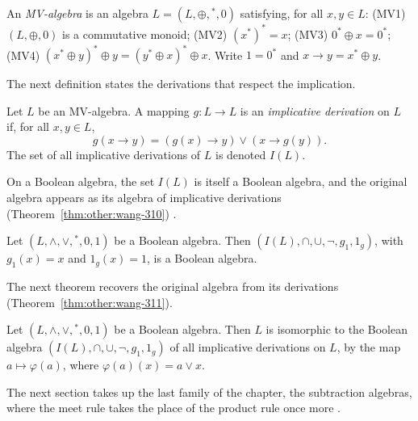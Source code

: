 \begin{definition}\label{def:other:mv-algebra}
An \emph{MV-algebra} is an algebra $L = (L, \oplus, {}^{*}, 0)$
satisfying, for all $x, y \in L$:
\textup{(MV1)} $(L, \oplus, 0)$ is a commutative monoid;
\textup{(MV2)} $(x^{*})^{*} = x$;
\textup{(MV3)} $0^{*} \oplus x = 0^{*}$;
\textup{(MV4)} $(x^{*} \oplus y)^{*} \oplus y = (y^{*} \oplus x)^{*} \oplus x$.
Write $1 = 0^{*}$ and $x \to y = x^{*} \oplus y$.
\end{definition}

The next definition states the derivations that respect the implication.

\begin{definition}\label{def:other:mv-implicative}
Let $L$ be an MV-algebra. A mapping $g \colon L \to L$ is an
\emph{implicative derivation} on $L$ if, for all $x, y \in L$,
\[
g(x \to y) = (g(x) \to y) \vee (x \to g(y)).
\]
The set of all implicative derivations of $L$ is denoted $I(L)$.
\end{definition}

On a Boolean algebra, the set $I(L)$ is itself a Boolean algebra, and the
original algebra appears as its algebra of implicative derivations (Theorem~\ref{thm:other:wang-310})
\cite[Theorem~3.10, p.~267]{WangSheQian2019}.\begin{theorem}\label{thm:other:wang-310}
Let $(L, \wedge, \vee, {}^{*}, 0, 1)$ be a Boolean algebra. Then
$(I(L), \cap, \cup, \neg, g_{1}, 1_{g})$, with $g_{1}(x) = x$ and
$1_{g}(x) = 1$, is a Boolean algebra.
\end{theorem}

The next theorem recovers the original algebra from its derivations
(Theorem~\ref{thm:other:wang-311}).

\begin{theorem}\label{thm:other:wang-311}
Let $(L, \wedge, \vee, {}^{*}, 0, 1)$ be a Boolean algebra. Then $L$ is
isomorphic to the Boolean algebra $(I(L), \cap, \cup, \neg, g_{1}, 1_{g})$
of all implicative derivations on $L$, by the map $a \mapsto \varphi(a)$,
where $\varphi(a)(x) = a \vee x$.
\end{theorem}

The next section takes up the last family of the chapter, the subtraction
algebras, where the meet rule takes the place of the product rule once
more \cite[Definition~3.1, p.~511]{OzturkCeven2009}.
